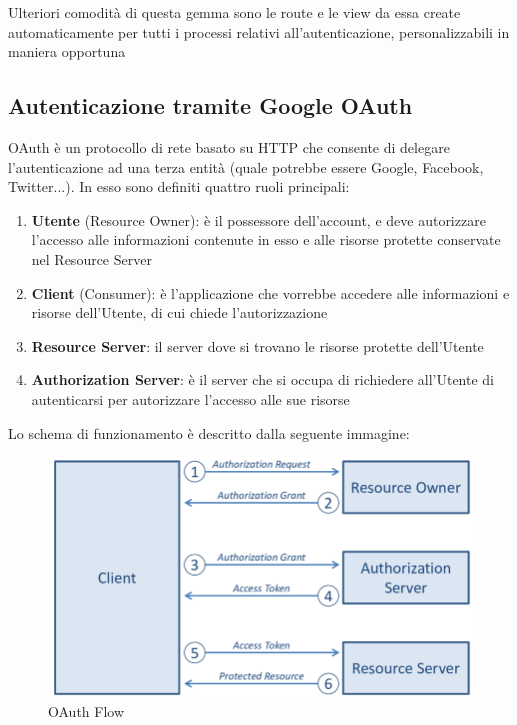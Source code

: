 \documentclass[Lau, binding=0.6cm, oneside]{sapthesis}
\begin{document}
Ulteriori comodità di questa gemma sono le route e le view da essa create automaticamente per tutti i processi relativi all’autenticazione, personalizzabili in maniera opportuna

\subsection{Autenticazione tramite Google OAuth}

OAuth è un protocollo di rete basato su HTTP che consente di delegare l’autenticazione ad una terza entità (quale potrebbe essere Google, Facebook, Twitter...). In esso sono definiti quattro ruoli principali:

\begin{enumerate}
	\item \textbf{Utente} (Resource Owner): è il possessore dell’account, e deve autorizzare l’accesso alle informazioni contenute in esso e alle risorse protette conservate nel Resource Server
	\item \textbf{Client} (Consumer): è l’applicazione che vorrebbe accedere alle informazioni e risorse dell’Utente, di cui chiede l’autorizzazione
	\item \textbf{Resource Server}: il server dove si trovano le risorse protette dell’Utente
	\item \textbf{Authorization Server}: è il server che si occupa di richiedere all’Utente di autenticarsi per autorizzare l’accesso alle sue risorse
\end{enumerate}

Lo schema di funzionamento è descritto dalla seguente immagine:\\

\begin{figure}[H]
	\centering
	\includegraphics[width=0.90\linewidth]{images/oauth}
	\caption{OAuth Flow}
	\label{fig:oauth}
\end{figure}
\end{document}
